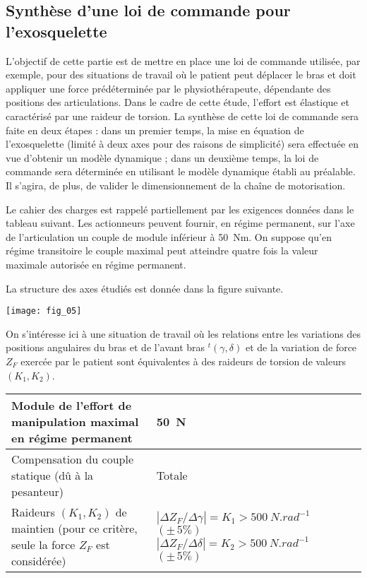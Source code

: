\ifprof
\else
\begin{multicols}{2}
\fi


\subsection*{Synthèse d’une loi de commande pour l’exosquelette}

\begin{obj}
L’objectif de cette partie est de mettre en place une loi de commande utilisée, par exemple, pour des
situations de travail où le patient peut déplacer le bras et doit appliquer une force prédéterminée par le
physiothérapeute, dépendante des positions des articulations. Dans le cadre de cette étude, l’effort est
élastique et caractérisé par une raideur de torsion. La synthèse de cette loi de commande sera faite en
deux étapes : dans un premier temps, la mise en équation de l’exosquelette (limité à deux axes pour des
raisons de simplicité) sera effectuée en vue d’obtenir un modèle dynamique ; dans un deuxième temps,
la loi de commande sera déterminée en utilisant le modèle dynamique établi au préalable. Il s’agira, de
plus, de valider le dimensionnement de la chaîne de motorisation.
\end{obj}

Le cahier des charges est rappelé partiellement par les exigences données dans le tableau suivant. Les actionneurs peuvent fournir, en régime permanent, sur l’axe de l’articulation un
couple de module inférieur à \SI{50}{Nm}. On suppose qu’en régime transitoire le couple maximal peut atteindre quatre fois la valeur maximale autorisée en régime permanent.

La structure des axes étudiés est donnée dans la figure suivante.

\begin{center}
\texttt{[image: fig\_05]}
\end{center}



On s’intéresse ici à une situation de travail où les relations entre les variations des positions angulaires du
bras et de l’avant bras $ ^t(\gamma,\delta)$ et de la variation de force $Z_F$ exercée par le patient sont équivalentes à des raideurs de torsion de valeurs $(K_1,K_2)$.


\begin{center}
\begin{tabular}{|p{.45\linewidth}|p{.45\linewidth}|}
\hline
Module de l’effort de manipulation maximal en régime permanent & \SI{50}{N} \\
\hline
Compensation du couple statique (dû à la pesanteur) & Totale \\ \hline
Raideurs $(K_1,K_2)$ de maintien (pour ce critère, seule la force $Z_F$ est
considérée) & $\left | \Delta Z_F / \Delta \gamma \right | = K_1 > \SI{500}{N.rad^{-1}}$ $(\pm\,5\%)$ 
$\left | \Delta Z_F / \Delta \delta \right  | = K_2 > \SI{500}{N.rad^{-1}}$ $(\pm\,5\%)$ \\
\hline
\end{tabular}
\end{center}



\end{multicols}

